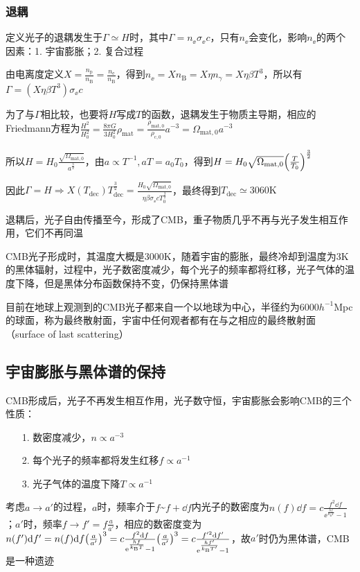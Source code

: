 \subsubsection{退耦}
\par 
定义光子的退耦发生于$\Gamma \simeq H$时，其中$\Gamma = n_{\ee} \sigma_{\ee} c$，只有$n_{\ee}$会变化，影响$n_{\ee}$的两个因素：1. 宇宙膨胀；2. 复合过程
\par 
由电离度定义$X = \frac{n_{\text{p}}}{n_{\text{B}}} = \frac{n_{\text{e}}}{n_{\text{B}}}$，得到$n_{\ee} = X n_{\text{B}} = X \eta n_{\gamma} = X \eta \beta T^3$，所以有$\Gamma = (X \eta \beta T^3) \sigma_{\ee} c$
\par 
为了与$\Gamma$相比较，也要将$H$写成$T$的函数，退耦发生于物质主导期，相应的Friedmann方程为$\frac{H^2}{H^2_0} = \frac{8 \pi G}{3 H_0^2} \rho_{\text{mat}} = \frac{\rho_{\text{mat}, 0}}{\rho_{\text{c}, 0}} a^{-3} = \Omega_{ \text{mat}, 0 } a^{-3}$
\par 
所以$H = H_0 \frac{\sqrt{\Omega_{ \text{mat}, 0 }}}{a^{\frac{3}{2}}}$，由$a \propto T^{-1}, aT = a_0 T_0$，得到$H = H_0 \sqrt{\Omega_{ \text{mat}, 0 }} \qty(\frac{T}{T_0})^{\frac{3}{2}}$
\par 
因此$\Gamma = H \Rightarrow X(T_{\text{dec}}) T_{\text{dec}}^{\frac{3}{2}} = \frac{H_0 \sqrt{\Omega_{ \text{mat}, 0 }}}{\eta \beta \sigma_{\ee} c T_0^{\frac{3}{2}}}$，最终得到$T_{\text{dec}} \simeq 3060 \mathrm{K}$
\par 
退耦后，光子自由传播至今，形成了CMB，重子物质几乎不再与光子发生相互作用，它们不再同温

\par
CMB光子形成时，其温度大概是3000K，随着宇宙的膨胀，最终冷却到温度为3K的黑体辐射，过程中，光子数密度减少，每个光子的频率都将红移，光子气体的温度下降，但是黑体分布函数保持不变，仍保持黑体谱

\par 
目前在地球上观测到的CMB光子都来自一个以地球为中心，半径约为$ 6000 h^{-1} $Mpc的球面，称为最终散射面，宇宙中任何观者都有在与之相应的最终散射面（surface of last scattering）

\subsection{宇宙膨胀与黑体谱的保持}
\par 
CMB形成后，光子不再发生相互作用，光子数守恒，宇宙膨胀会影响CMB的三个性质：
\begin{itemize}
	\item[1. ] 数密度减少，$n \propto a^{-3}$
	\item[2. ] 每个光子的频率都将发生红移$f \propto a^{-1}$
	\item[3. ] 光子气体的温度下降$T \propto a^{-1}$
\end{itemize}
\par 
考虑$a \rightarrow a'$的过程，$a$时，频率介于$f$\textasciitilde$f + \dd f$内光子的数密度为$n(f) \dd f = c \frac{f^2 \dd f}{\ee^{\frac{h f}{k_{\text{B}}T}} - 1}$；$a'$时，频率$f \rightarrow f'  = f\frac{a}{a'}$，相应的数密度变为$n(f') \dd f' = n(f) \dd f \qty(\frac{a}{a'})^3 = c \frac{f^2 \dd f}{\mathrm{e}^{\frac{h f}{k_{\text{B}}T}} - 1} \qty(\frac{a}{a'})^3 = c \frac{f'^2 \dd f'}{\mathrm{e}^{\frac{h f'}{k_{\text{B}}T'}} - 1}$，故$a'$时仍为黑体谱，CMB是一种遗迹

